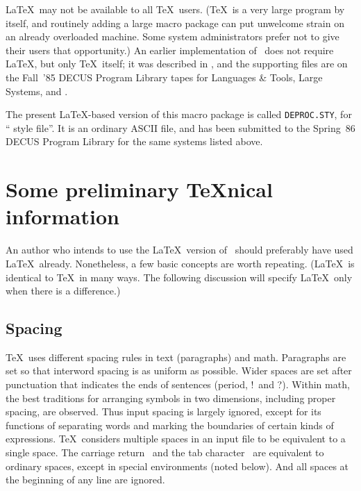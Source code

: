 \LaTeX\ may not be available to all \TeX\ users.  (\TeX\ is a very large
program by itself, and routinely adding a large macro package can put
unwelcome strain on an already overloaded machine.  Some system
administrators prefer not to give their users that opportunity.)
An earlier implementation of \DP\ does not require \LaTeX, but only
\TeX\ itself; it was
described in \cite{DP}, and the supporting files are on the Fall~'85
DECUS Program Library tapes for Languages \& Tools, Large Systems, and \VAX.

The present \LaTeX-based version of this macro package
is called \verb|DEPROC.STY|, for ``\DProc\/ style file''.  It is
an ordinary ASCII file, and has been submitted to the Spring~86 DECUS
Program Library for the same systems listed above.











\section{Some preliminary \TeX nical information}

An author who intends to use the \LaTeX\ version of \DP\ should
preferably have used \LaTeX\ already.  Nonetheless, a few basic
concepts are worth repeating.  (\LaTeX\ is identical to \TeX\ in
many ways.  The following discussion will specify \LaTeX\ only when
there is a difference.)

\subsection{Spacing}

\TeX\ uses different spacing rules in text (paragraphs) and math.
Paragraphs are set so that interword spacing is as uniform as possible.
Wider spaces are set after punctuation that indicates the ends of
sentences (period, !\ and ?).  Within math, the best traditions for
arranging symbols in two dimensions, including proper spacing, are
observed.  Thus input spacing is largely ignored, except
for its functions of separating words and marking the boundaries of
certain kinds of expressions.  \TeX\ considers
multiple spaces in an input file to be equivalent to a single space.
The carriage return \CR\ and the tab character \tab\ are equivalent
to ordinary spaces, except in special environments (noted below).
And all spaces at the beginning of any line are ignored.

